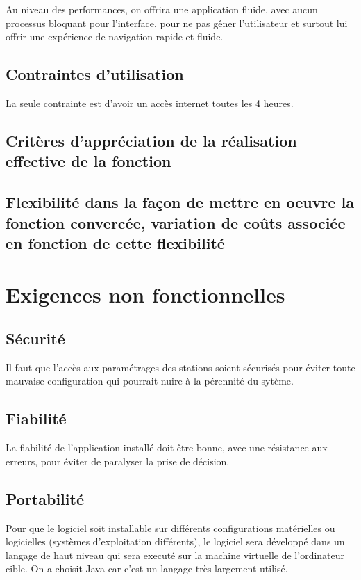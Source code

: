 Au niveau des performances, on offrira une application fluide, avec aucun processus bloquant pour l'interface, pour ne pas gêner l'utilisateur et surtout lui offrir une expérience de navigation rapide et fluide.

\subsection{Contraintes d'utilisation}
La seule contrainte est d'avoir un accès internet toutes les 4 heures.

\subsection{Critères d'appréciation de la réalisation effective de la fonction}

\subsection{Flexibilité dans la façon de mettre en oeuvre la fonction convercée, variation de coûts associée en fonction de cette flexibilité}

\section{Exigences non fonctionnelles}
\subsection{Sécurité}
Il faut que l'accès aux paramétrages des stations soient sécurisés pour éviter toute mauvaise configuration qui pourrait nuire à la pérennité du sytème.

\subsection{Fiabilité}
La fiabilité de l'application installé doit être bonne, avec une résistance aux erreurs, pour éviter de paralyser la prise de décision.

\subsection{Portabilité}
Pour que le logiciel soit installable sur différents configurations matérielles ou logicielles (systèmes d'exploitation différents), le logiciel sera développé dans un langage de haut niveau qui sera executé sur la machine virtuelle de l'ordinateur cible. On a choisit Java car c'est un langage très largement utilisé.

